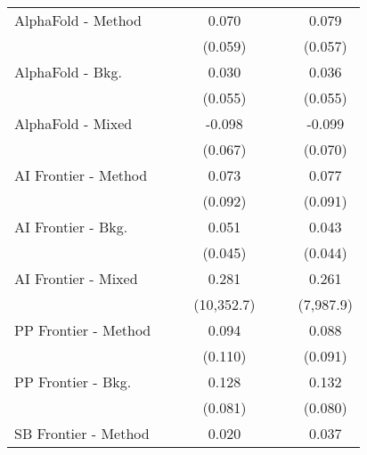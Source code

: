 \begin{tabular}{lcccccc}
   AlphaFold - Method           &               &              & 0.070      &               &             & 0.079\\   
                                &               &              & (0.059)    &               &             & (0.057)\\   
   AlphaFold - Bkg.             &               &              & 0.030      &               &             & 0.036\\   
                                &               &              & (0.055)    &               &             & (0.055)\\   
   AlphaFold - Mixed            &               &              & -0.098     &               &             & -0.099\\   
                                &               &              & (0.067)    &               &             & (0.070)\\   
   AI Frontier - Method         &               &              & 0.073      &               &             & 0.077\\   
                                &               &              & (0.092)    &               &             & (0.091)\\   
   AI Frontier - Bkg.           &               &              & 0.051      &               &             & 0.043\\   
                                &               &              & (0.045)    &               &             & (0.044)\\   
   AI Frontier - Mixed          &               &              & 0.281      &               &             & 0.261\\   
                                &               &              & (10,352.7) &               &             & (7,987.9)\\   
   PP Frontier - Method         &               &              & 0.094      &               &             & 0.088\\   
                                &               &              & (0.110)    &               &             & (0.091)\\   
   PP Frontier - Bkg.           &               &              & 0.128      &               &             & 0.132\\   
                                &               &              & (0.081)    &               &             & (0.080)\\   
   SB Frontier - Method         &               &              & 0.020      &               &             & 0.037\\   

\end{tabular}
